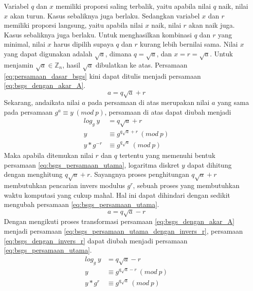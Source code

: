 Variabel $ q $ dan $ x $ memiliki proporsi saling terbalik, yaitu apabila nilai $ q $ naik, nilai $ x $ akan turun. Kasus sebaliknya juga berlaku. Sedangkan variabel $ x $ dan $ r $ memiliki proporsi langsung, yaitu apabila nilai $ x $ naik, nilai $ r $ akan naik juga. Kasus sebaliknya juga berlaku. Untuk menghasilkan kombinasi $ q $ dan $ r $ yang minimal, nilai $ x $ harus dipilih supaya $ q $ dan $ r $ kurang lebih bernilai sama. Nilai $ x $ yang dapat digunakan adalah $ \sqrt{a} $, dimana $ q=\sqrt{a} $, dan $ x=r=\sqrt{a} $. Untuk menjamin $ \sqrt{a} \in \mathbb{Z}_n $, hasil $ \sqrt{a} $ dibulatkan ke atas. Persamaan \eqref{eq:persamaan_dasar_bsgs} kini dapat ditulis menjadi persamaan \eqref{eq:bsgs_dengan_akar_A}.
\begin{equation}
a=q\sqrt{a}+r
\label{eq:bsgs_dengan_akar_A}
\end{equation}
Sekarang, andaikata nilai $ a $ pada persamaan di atas merupakan nilai $ a $ yang sama pada persamaan $ g^a \equiv y\ (mod\ p) $, persamaan di atas dapat diubah menjadi
\begin{align}
log_{g}\ y &= q\sqrt{a}+r \\
y &\equiv g^{q\sqrt{a}+r}\ (mod\ p) \\
y*g^{-r} &\equiv g^{q\sqrt{a}}\ (mod\ p)
\label{eq:bsgs_persamaan_utama_dengan_invers_r}
\end{align}
Maka apabila ditemukan nilai $ r $ dan $ q $ tertentu yang memenuhi bentuk persamaan \eqref{eq:bsgs_persamaan_utama}, logaritma diskret $ y $ dapat dihitung dengan menghitung $ q\sqrt{a}+r $. Sayangnya proses penghitungan $ q\sqrt{a}+r $ membutuhkan pencarian invers modulus $ g^r $, sebuah proses yang membutuhkan waktu komputasi yang cukup mahal. Hal ini dapat dihindari dengan sedikit mengubah persamaan \eqref{eq:bsgs_persamaan_utama}.
\begin{equation}
a=q\sqrt{a}-r
\label{eq:bsgs_dengan_invers_r}
\end{equation}
Dengan mengikuti proses transformasi persamaan \eqref{eq:bsgs_dengan_akar_A} menjadi persamaan \eqref{eq:bsgs_persamaan_utama_dengan_invers_r}, persamaan \eqref{eq:bsgs_dengan_invers_r} dapat diubah menjadi persamaan \eqref{eq:bsgs_persamaan_utama}.
\begin{align}
log_{g}\ y &= q\sqrt{a} - r \\
y &\equiv g^{q\sqrt{a} - r}\ (mod\ p) \\
y*g^r &\equiv g^{q\sqrt{a}}\ (mod\ p)
\label{eq:bsgs_persamaan_utama}
\end{align}
